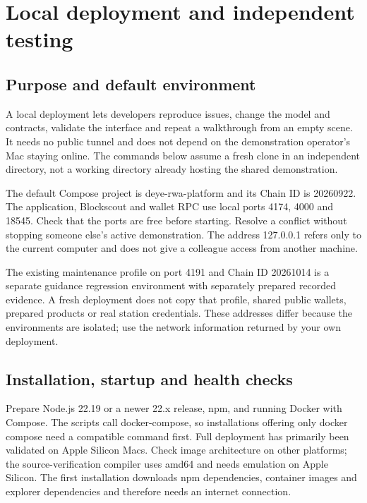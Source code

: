 \documentclass[12pt,a4paper]{article}
\begin{document}
\clearpage\section{Local deployment and independent testing}
\subsection{Purpose and default environment}
A local deployment lets developers reproduce issues, change the model and contracts, validate the interface and repeat a walkthrough from an empty scene. It needs no public tunnel and does not depend on the demonstration operator's Mac staying online. The commands below assume a fresh clone in an independent directory, not a working directory already hosting the shared demonstration.

The default Compose project is deye-rwa-platform and its Chain ID is 20260922. The application, Blockscout and wallet RPC use local ports 4174, 4000 and 18545. Check that the ports are free before starting. Resolve a conflict without stopping someone else's active demonstration. The address 127.0.0.1 refers only to the current computer and does not give a colleague access from another machine.

The existing maintenance profile on port 4191 and Chain ID 20261014 is a separate guidance regression environment with separately prepared recorded evidence. A fresh deployment does not copy that profile, shared public wallets, prepared products or real station credentials. These addresses differ because the environments are isolated; use the network information returned by your own deployment.

\begin{center}\end{center}
\clearpage
\subsection{Installation, startup and health checks}
Prepare Node.js 22.19 or a newer 22.x release, npm, and running Docker with Compose. The scripts call docker-compose, so installations offering only docker compose need a compatible command first. Full deployment has primarily been validated on Apple Silicon Macs. Check image architecture on other platforms; the source-verification compiler uses amd64 and needs emulation on Apple Silicon. The first installation downloads npm dependencies, container images and explorer dependencies and therefore needs an internet connection.
\end{document}
